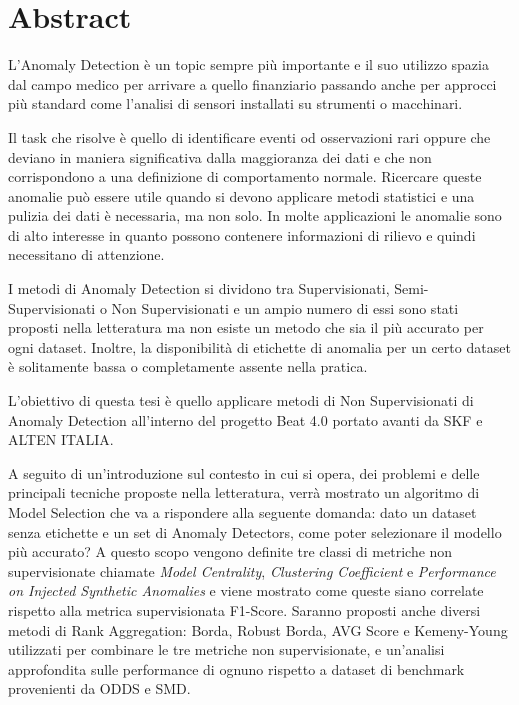 \chapter*{Abstract}
L’Anomaly Detection è un topic sempre più importante e il suo utilizzo spazia dal campo medico per arrivare a quello finanziario passando anche per approcci più standard come l'analisi di sensori installati su strumenti o macchinari.

Il task che risolve è quello di identificare eventi od osservazioni rari oppure che deviano in maniera significativa dalla maggioranza dei dati e che non corrispondono a una definizione di comportamento normale. Ricercare queste anomalie può essere utile quando si devono applicare metodi statistici e una pulizia dei dati è necessaria, ma non solo. In molte applicazioni le anomalie sono di alto interesse in quanto possono contenere informazioni di rilievo e quindi necessitano di attenzione. 

I metodi di Anomaly Detection si dividono tra Supervisionati, Semi-Supervisionati o Non Supervisionati e un ampio numero di essi sono stati proposti nella letteratura ma non esiste un metodo che sia il più accurato per ogni dataset. Inoltre, la disponibilità di etichette di anomalia per un certo dataset è solitamente bassa o completamente assente nella pratica. 


L’obiettivo di questa tesi è quello applicare metodi di Non Supervisionati di Anomaly Detection all'interno del progetto Beat 4.0 portato avanti da SKF e ALTEN ITALIA. 

A seguito di un'introduzione sul contesto in cui si opera, dei problemi e delle principali tecniche proposte nella letteratura, verrà mostrato un algoritmo di Model Selection che va a rispondere alla seguente domanda: dato un dataset senza etichette e un set di Anomaly Detectors, come poter selezionare il modello più accurato? A questo scopo vengono definite tre classi di metriche non supervisionate chiamate \textit{Model Centrality}, \textit{Clustering Coefficient} e \textit{Performance on Injected Synthetic Anomalies} e viene mostrato come queste siano correlate rispetto alla metrica supervisionata F1-Score. Saranno proposti anche diversi metodi di Rank Aggregation: Borda, Robust Borda, AVG Score e Kemeny-Young utilizzati per combinare le tre metriche non supervisionate, e un'analisi approfondita sulle performance di ognuno rispetto a dataset di benchmark provenienti da ODDS e SMD.

